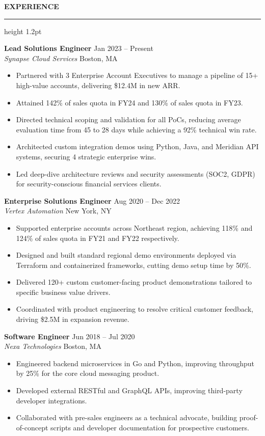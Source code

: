 \documentclass[10pt]{article}
\newcommand{\sectionheader}[1]{%
  \vspace{8pt}%
  {\color{primary}\fontfamily{phv}\selectfont\large\bfseries\MakeUppercase{#1}}%
  \vspace{2pt}%
  {\color{accent}\hrule height 1.2pt}%
  \vspace{4pt}%
}
\newcommand{\jobentry}[4]{%
  \vspace{3pt}%
  \textbf{\color{primary}#1} \hfill {\color{secondary}\small #2}\\%
  \textit{\color{accent}#3} \hfill {\color{secondary}\small #4}%
  \vspace{2pt}%
}
\begin{document}
\begin{minipage}[t]{0.62\textwidth}
  \sectionheader{Experience}
  
  \jobentry{Lead Solutions Engineer}{Jan 2023 -- Present}{Synapse Cloud Services}{Boston, MA}
  \begin{itemize}
    \item Partnered with 3 Enterprise Account Executives to manage a pipeline of 15+ high-value accounts, delivering \$12.4M in new ARR.
    \item Attained 142\% of sales quota in FY24 and 130\% of sales quota in FY23.
    \item Directed technical scoping and validation for all PoCs, reducing average evaluation time from 45 to 28 days while achieving a 92\% technical win rate.
    \item Architected custom integration demos using Python, Java, and Meridian API systems, securing 4 strategic enterprise wins.
    \item Led deep-dive architecture reviews and security assessments (SOC2, GDPR) for security-conscious financial services clients.
  \end{itemize}

  \jobentry{Enterprise Solutions Engineer}{Aug 2020 -- Dec 2022}{Vertex Automation}{New York, NY}
  \begin{itemize}
    \item Supported enterprise accounts across Northeast region, achieving 118\% and 124\% of sales quota in FY21 and FY22 respectively.
    \item Designed and built standard regional demo environments deployed via Terraform and containerized frameworks, cutting demo setup time by 50\%.
    \item Delivered 120+ custom customer-facing product demonstrations tailored to specific business value drivers.
    \item Coordinated with product engineering to resolve critical customer feedback, driving \$2.5M in expansion revenue.
  \end{itemize}

  \jobentry{Software Engineer}{Jun 2018 -- Jul 2020}{Nexa Technologies}{Boston, MA}
  \begin{itemize}
    \item Engineered backend microservices in Go and Python, improving throughput by 25\% for the core cloud messaging product.
    \item Developed external RESTful and GraphQL APIs, improving third-party developer integrations.
    \item Collaborated with pre-sales engineers as a technical advocate, building proof-of-concept scripts and developer documentation for prospective customers.
  \end{itemize}
\end{minipage}%
\end{document}
